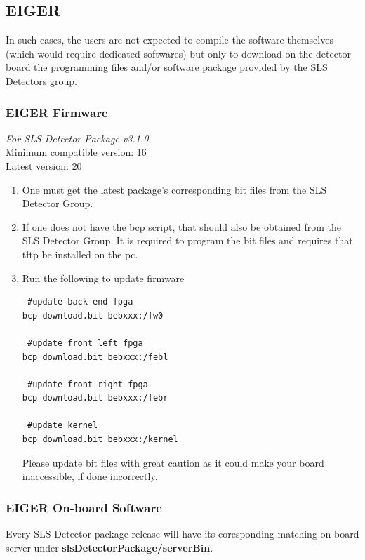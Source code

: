 \documentclass{article}
\begin{document}
\subsection{EIGER}

In such cases, the users are not expected to compile the software
themselves (which would require dedicated softwares) but only to download on the
detector board the programming files and/or software package provided by
the SLS Detectors group.

\subsubsection{EIGER Firmware}
\textit{For SLS Detector Package v3.1.0} \\
\indent Minimum compatible version:  16 \\
\indent Latest version:	20  \\


\begin{enumerate}
  \item One must get the latest package's corresponding bit files from the SLS
Detector Group.
  \item If one does not have the bcp script, that should also be obtained from
the SLS Detector Group. It is required to program the bit files and requires
that tftp be installed on the pc.
  \item Run the following to update firmware
\begin{verbatim}
 #update back end fpga
bcp download.bit bebxxx:/fw0

 #update front left fpga
bcp download.bit bebxxx:/febl

 #update front right fpga
bcp download.bit bebxxx:/febr

 #update kernel
bcp download.bit bebxxx:/kernel
\end{verbatim}
Please update bit files with great caution as it could make your board
inaccessible, if done incorrectly.
\end{enumerate}



\subsubsection{EIGER On-board Software}
Every SLS Detector package release will have its coresponding matching on-board
server under \textbf{slsDetectorPackage/serverBin}.
\end{document}
